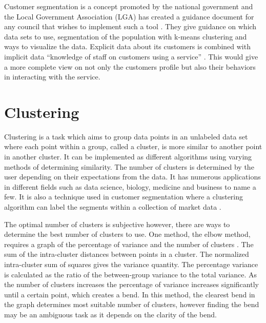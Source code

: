 Customer segmentation is a concept promoted by the national government and the Local Government Association (LGA) has created a guidance document for any council that wishes to implement such a tool \cite{lgaguide}. They give guidance on which data sets to use, segmentation of the population with k-means clustering and ways to visualize the data. Explicit data about its customers is combined with implicit data ``knowledge of staff on customers using a service'' \cite{smartcities}. This would give a more complete view on not only the customers\textsc{} profile but also their behaviors in interacting with the service.\par

\section{Clustering}

Clustering is a task which aims to group data points in an unlabeled data set where each point within a group, called a cluster, is more similar to another point in another cluster. It can be implemented as different algorithms using varying methods of determining similarity. The number of clusters is determined by the user depending on their expectations from the data. It has numerous applications in different fields such as data science, biology, medicine and business to name a few. It is also a technique used in customer segmentation where a clustering algorithm can label the segments within a collection of market data \cite{lgaguide}. \par


The optimal number of clusters is subjective however, there are ways to determine the best number of clusters to use. One method, the elbow method, requires a graph of the percentage of variance and the number of clusters \cite{thedatasciencelab2014}. The sum of the intra-cluster distances between points in a cluster. The normalized intra-cluster sum of squares gives the variance quantity. The percentage variance is calculated as the ratio of the between-group variance to the total variance. As the number of clusters increases the percentage of variance increases significantly until a certain point, which creates a bend. In this method, the clearest bend in the graph determines most suitable number of clusters, however finding the bend may be an ambiguous task as it depends on the clarity of the bend.\par

